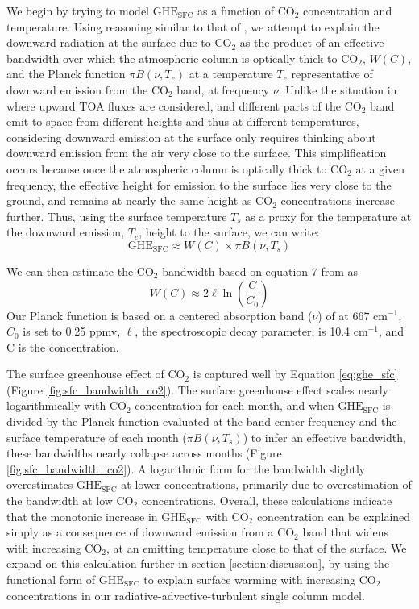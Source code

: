 \documentclass[draft]{agujournal2019}
\begin{document}
We begin by trying to model ${\text{GHE}_\text{{SFC}}}$ as a function of CO$_2$ concentration and temperature. Using reasoning similar to that of , we attempt to explain the downward radiation at the surface due to CO$_2$ as the product of an effective bandwidth over which the atmospheric column is optically-thick to CO$_2$, $W(C)$, and the Planck function $\pi B(\nu,T_e)$ at a temperature $T_e$ representative of downward emission from the CO$_2$ band, at frequency $\nu$. Unlike the situation in  where upward TOA fluxes are considered, and different parts of the CO$_2$ band emit to space from different heights and thus at different temperatures, considering downward emission at the surface only requires thinking about downward emission from the air very close to the surface. This simplification occurs because once the atmospheric column is optically thick to CO$_2$ at a given frequency, the effective height for emission to the surface lies very close to the ground, and remains at nearly the same height as CO$_2$ concentrations increase further. Thus, using the surface temperature $T_s$ as a proxy for the temperature at the downward emission, $T_e$, height to the surface, we can write:
\begin{equation}
    {\text{GHE}_\text{{SFC}}} \approx W(C)\times \pi B(\nu,T_s) \label{eq:ghe_sfc}
\end{equation}

We can then estimate the CO$_2$ bandwidth based on equation 7 from  as
\begin{equation}\label{eq:bandwidth}
    W(C) \approx 2\ell \ln \left(\frac{C}{C_0}\right)
\end{equation}
Our Planck function is based on a centered absorption band ($\nu$) of  at 667 cm$^{-1}$, $C_0$ is set to 0.25 ppmv, $\ell$, the spectroscopic decay parameter, is 10.4 cm$^{-1}$, and C is the  concentration. 

The surface greenhouse effect of CO$_2$ is captured well by Equation \ref{eq:ghe_sfc} (Figure \ref{fig:sfc_bandwidth_co2}). The surface greenhouse effect scales nearly logarithmically with CO$_2$ concentration for each month, and when ${\text{GHE}_\text{{SFC}}}$ is divided by the Planck function evaluated at the band center frequency and the surface temperature of each month ($\pi B(\nu,T_s)$) to infer an effective bandwidth, these bandwidths nearly collapse across months (Figure \ref{fig:sfc_bandwidth_co2}). A logarithmic form for the bandwidth slightly overestimates ${\text{GHE}_\text{{SFC}}}$ at lower  concentrations, primarily due to overestimation of the bandwidth at low CO$_2$ concentrations. Overall, these calculations indicate that the monotonic increase in ${\text{GHE}_\text{{SFC}}}$ with CO$_2$ concentration can be explained simply as a consequence of downward emission from a CO$_2$ band that widens with increasing CO$_2$, at an emitting temperature close to that of the surface. We expand on this calculation further in section \ref{section:discussion}, by using the functional form of ${\text{GHE}_\text{{SFC}}}$ to explain surface warming with increasing CO$_2$ concentrations in our radiative-advective-turbulent single column model.
\end{document}
